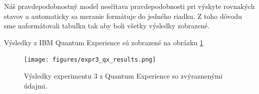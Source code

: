 Náš pravdepodobnostný model nesčítava pravdepodobnosti pri výskyte rovnakých 
stavov a automaticky sa meranie formátuje do jedného riadku. Z toho dôvodu sme 
naformátovali tabuľku tak aby boli všetky výsledky zobrazené.

Výsledky z IBM Quantum Experience sú zobrazené na obrázku \ref{expr3_qx_results}

\begin{figure} 
	\centering 
	\texttt{[image: figures/expr3\_qx\_results.png]} 
	\caption{Výsledky experimentu 3 z Quantum Experience so zvýraznenými 
údajmi.}

    \label{expr3_qx_results}
\end{figure}
